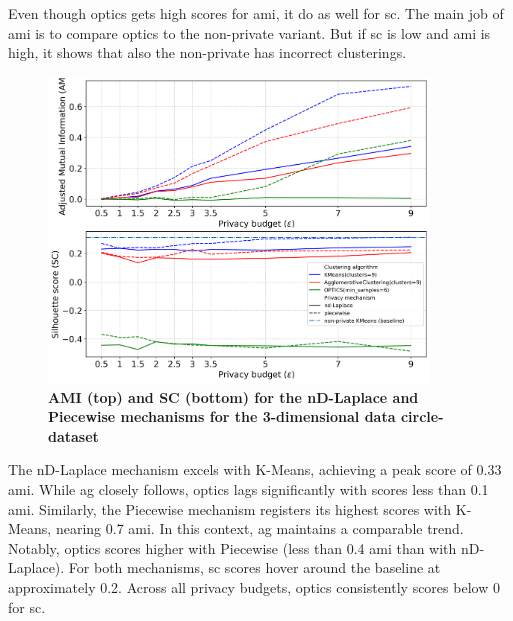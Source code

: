 Even though \gls{optics} gets high scores for \gls{ami}, it  do as well for \gls{sc}. The main job of \gls{ami} is to compare \gls{optics} to the non-private variant. But if \gls{sc} is low and \gls{ami} is high, it shows that also the non-private has incorrect clusterings.
\newpage
\begin{figure}[H]
  \centering

  \caption{\textbf{AMI (top) and SC (bottom) for the nD-Laplace and Piecewise mechanisms for the 3-dimensional data circle-dataset}}
  \includegraphics[width=0.9\textwidth]{Results/nd-laplace/nd-Laplace/circle-dataset/ami-and-sc_3_dimensions.png}

  \label{fig:validation-circle-dataset_comparison_3d-laplace}
\end{figure}
The nD-Laplace mechanism excels with K-Means, achieving a peak score of 0.33 \gls{ami}. While \gls{ag} closely follows, \gls{optics} lags significantly with scores less than 0.1 \gls{ami}. Similarly, the Piecewise mechanism registers its highest scores with K-Means, nearing 0.7 \gls{ami}. In this context, \gls{ag} maintains a comparable trend. Notably, \gls{optics} scores higher with Piecewise (less than 0.4 \gls{ami} than with nD-Laplace). For both mechanisms, \gls{sc} scores hover around the baseline at approximately 0.2. Across all privacy budgets, \gls{optics} consistently scores below 0 for \gls{sc}.
\newpage
